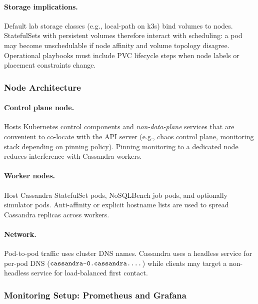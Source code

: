 \documentclass[11pt,a4paper]{article}
\begin{document}
\paragraph{Storage implications.}
Default lab storage classes (e.g., local-path on k3s) bind volumes to nodes. StatefulSets with persistent volumes therefore interact with scheduling: a pod may become unschedulable if node affinity and volume topology disagree. Operational playbooks must include PVC lifecycle steps when node labels or placement constraints change.

\subsubsection{Node Architecture}
\label{subsubsec:node-arch}

\paragraph{Control plane node.}
Hosts Kubernetes control components and \emph{non-data-plane} services that are convenient to co-locate with the API server (e.g., chaos control plane, monitoring stack depending on pinning policy). Pinning monitoring to a dedicated node reduces interference with Cassandra workers.

\paragraph{Worker nodes.}
Host Cassandra StatefulSet pods, NoSQLBench job pods, and optionally simulator pods. Anti-affinity or explicit hostname lists are used to spread Cassandra replicas across workers.

\paragraph{Network.}
Pod-to-pod traffic uses cluster DNS names. Cassandra uses a headless service for per-pod DNS ($\texttt{cassandra-0.cassandra.\dots}$) while clients may target a non-headless service for load-balanced first contact.

\subsubsection{Monitoring Setup: Prometheus and Grafana}
\label{subsubsec:monitoring}
\end{document}
